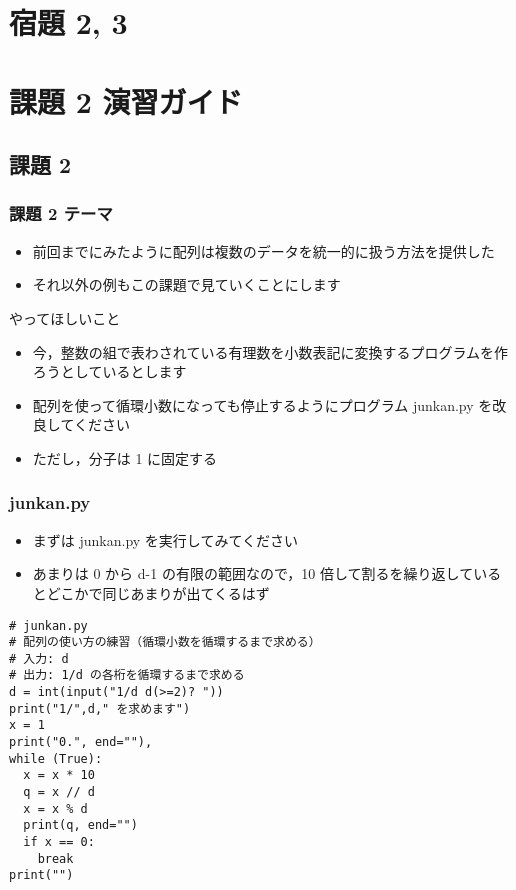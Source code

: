 %
%
\section{宿題 2, 3}
%
%
\section{課題 2 演習ガイド}
\subsection{課題 2}
\begin{frame}[label=quiz2]
\frametitle{課題 2 テーマ}
  \begin{itemize}
\item 前回までにみたように配列は複数のデータを統一的に扱う方法を提供した
\item それ以外の例もこの課題で見ていくことにします
  \end{itemize}
  \begin{block}{やってほしいこと}
    \begin{itemize}
\item 今，整数の組で表わされている有理数を小数表記に変換するプログラムを作ろうとしているとします
\item 配列を使って循環小数になっても停止するようにプログラム junkan.py を改良してください
\item ただし，分子は 1 に固定する
    \end{itemize}
  \end{block}
\end{frame}
\begin{frame}
\frametitle{junkan.py}
  \begin{itemize}
\item まずは junkan.py を実行してみてください
\item あまりは 0 から d-1 の有限の範囲なので，10 倍して割るを繰り返しているとどこかで同じあまりが出てくるはず
  \end{itemize}
  \begin{lstlisting}[caption={junkan.py},label=lst:rational]
# junkan.py
# 配列の使い方の練習（循環小数を循環するまで求める）
# 入力: d
# 出力: 1/d の各桁を循環するまで求める
d = int(input("1/d d(>=2)? "))
print("1/",d," を求めます")
x = 1
print("0.", end=""),
while (True):
  x = x * 10
  q = x // d
  x = x % d
  print(q, end="")
  if x == 0:
    break
print("")
  \end{lstlisting}
\end{frame}
